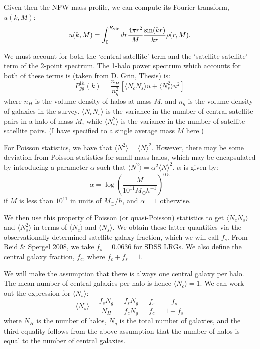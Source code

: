 \documentclass[onecolumn,amsmath,aps,fleqn, superscriptaddress]{revtex4}
\begin{document}
Given then the NFW mass profile, we can compute its Fourier transform, $u(k, M)$:
\begin{equation}
u(k, M) = \int_0^{R_{\rm vir}} dr \frac{4 \pi r^2}{M}\frac{\sin(kr)}{kr}\rho(r, M).
\label{u}
\end{equation}

We must account for both the `central-satellite' term and the `satellite-satellite' term of the 2-point spectrum. The 1-halo power spectrum which accounts for both of these terms is (taken from D. Grin, Thesis) is:
\begin{equation}
P_{gg}^{1h}(k) = \frac{n_H}{n_g^2}\left[\langle N_c N_s \rangle u + \langle N_s^2 \rangle u^2\right]
\label{1hpgg}
\end{equation}
where $n_H$ is the volume density of halos at mass $M$, and $n_g$ is the volume density of galaxies in the survey. $\langle N_c N_s \rangle$ is the variance in the number of central-satellite pairs in a halo of mass $M$, while $\langle N_s^2 \rangle$ is the variance in the number of satellite-satellite pairs. (I have specified to a single average mass $M$ here.) 

For Poisson statistics, we have that $\langle N^2 \rangle = \langle N \rangle^2$. However, there may be some deviation from Poisson statistics for small mass halos, which may be encapsulated by introducing a parameter $\alpha$ such that $\langle N^2 \rangle = \alpha^2\langle N \rangle^2$. $\alpha$ is given by:
\begin{equation}
\alpha = \log\left(\frac{M}{10^{11}M_\odot h^{-1}}\right)^{0.5}
\label{alpha}
\end{equation}
if $M$ is less than $10^{11}$ in units of $M_\odot / h$, and $\alpha=1$ otherwise. 

We then use this property of Poisson (or quasi-Poisson) statistics to get $\langle N_c N_s \rangle$ and $\langle N_s^2 \rangle$ in terms of $\langle N_c \rangle$ and $\langle N_s \rangle$. We obtain these latter quantities via the observationally-determined satellite galaxy fraction, which we will call $f_s$. From Reid \& Spergel 2008, we take $f_s = 0.0636$ for SDSS LRGs. We also define the central galaxy fraction, $f_c$, where $f_c + f_s=1$. 

We will make the assumption that there is always one central galaxy per halo. The mean number of central galaxies per halo is hence $\langle N_c \rangle=1$. We can work out the expression for $\langle N_s \rangle$:
\begin{equation}
\langle N_s \rangle = \frac{f_s N_g}{N_H} = \frac{f_s N_g}{f_c N_g} = \frac{f_s}{f_c} = \frac{f_s}{1-f_s}
\label{Nsmean}
\end{equation}
where $N_H$ is the number of halos, $N_g$ is the total number of galaxies, and the third equality follows from the above assumption that the number of halos is equal to the number of central galaxies.
\end{document}
